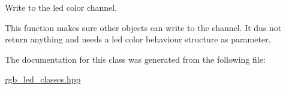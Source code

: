 Write to the led color channel. 

This function makes sure other objects can write to the channel. It dus not return anything and needs a led color behaviour structure as parameter. 

The documentation for this class was generated from the following file\+:\begin{DoxyCompactItemize}
\item 
\hyperlink{rgb__led__classes_8hpp}{rgb\+\_\+led\+\_\+classes.\+hpp}\end{DoxyCompactItemize}
